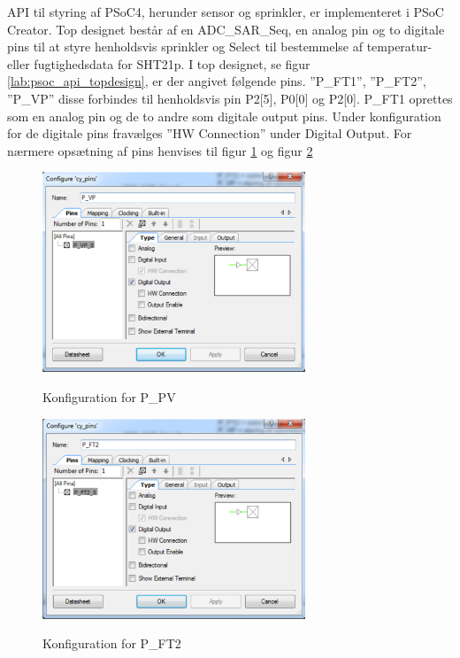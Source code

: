 
API til styring af PSoC4, herunder sensor og sprinkler, er implementeret i PSoC Creator. Top designet består af en ADC\_SAR\_Seq, en analog pin og to digitale pins til at styre henholdsvis sprinkler og Select til bestemmelse af temperatur- eller fugtighedsdata for SHT21p.
I top designet, se figur \ref{lab:psoc_api_topdesign}, er der angivet følgende pins. ''P\_FT1'', ''P\_FT2'', ''P\_VP'' disse forbindes til henholdsvis pin P2[5], P0[0] og P2[0]. P\_FT1 oprettes som en analog pin og de to andre som digitale output pins. Under konfiguration for de digitale pins fravælges ''HW Connection'' under Digital Output. For nærmere opsætning af pins henvises til figur \ref{lab:P_PV_config} og figur \ref{lab:P_FT2_config}

\begin{figure}[htb]
\centering
{\includegraphics[width=0.70\textwidth]{filer/pics/P_PV_config}}
\caption{Konfiguration for P\_PV}
\label{lab:P_PV_config}
\end{figure}


\begin{figure}[htb]
\centering
{\includegraphics[width=0.70\textwidth]{filer/pics/P_FT2_config}}
\caption{Konfiguration for P\_FT2}
\label{lab:P_FT2_config}
\end{figure}  

